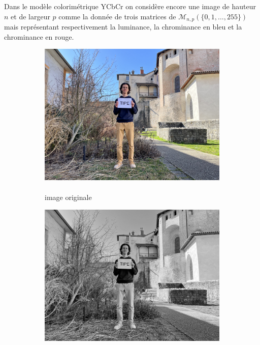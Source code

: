 \documentclass{article}
\begin{document}
Dans le modèle colorimétrique YCbCr on considère encore une image de hauteur $n$ et de largeur $p$ comme la donnée de trois matrices de $ \mathcal{M}_{n,p}(\{0, 1, \ldots, 255\}) $ mais représentant respectivement la luminance, la chrominance en bleu et la chrominance en rouge.

\begin{figure}[htbp]
    \centering
    \begin{subfigure}[b]{0.24\textwidth}
        \includegraphics[width=\textwidth]{transformation_couleur/principale_1000_750_smooth.png}
        \caption{\\ image originale}
    \end{subfigure}
    \hfill
    \begin{subfigure}[b]{0.24\textwidth}
        \includegraphics[width=\textwidth]{transformation_couleur/luminance.png}

\end{subfigure}
\end{figure}
\end{document}
